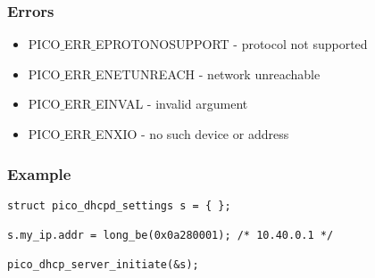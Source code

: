 \subsubsection*{Errors}
\begin{itemize}[noitemsep]
\item PICO$\_$ERR$\_$EPROTONOSUPPORT - protocol not supported
\item PICO$\_$ERR$\_$ENETUNREACH - network unreachable 
\item PICO$\_$ERR$\_$EINVAL - invalid argument
\item PICO$\_$ERR$\_$ENXIO - no such device or address
\end{itemize}

\subsubsection*{Example}
\begin{verbatim}
struct pico_dhcpd_settings s = { };

s.my_ip.addr = long_be(0x0a280001); /* 10.40.0.1 */

pico_dhcp_server_initiate(&s);
\end{verbatim}


